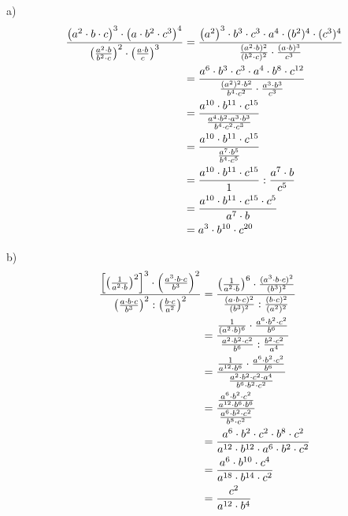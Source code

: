 \begin{solucio}
a)%
\begin{align*}
\frac{\left( a^{2}\cdot b\cdot c\right) ^{3}\cdot \left( a\cdot b^{2}\cdot
c^{3}\right) ^{4}}{\left( \frac{a^{2}\cdot b}{b^{2}\cdot c}\right) ^{2}\cdot
\left( \frac{a\cdot b}{c}\right) ^{3}} &=\frac{\left( a^{2}\right)
^{3}\cdot b^{3}\cdot c^{3}\cdot a^{4}\cdot (b^{2})^{4}\cdot (c^{3})^{4}}{%
\frac{(a^{2}\cdot b)^{2}}{(b^{2}\cdot c)^{2}}\cdot \frac{(a\cdot b)^{3}}{%
c^{3}}} \\
&=\frac{a^{6}\cdot b^{3}\cdot c^{3}\cdot a^{4}\cdot b^{8}\cdot c^{12}}{%
\frac{(a^{2})^{2}\cdot b^{2}}{b^{4}\cdot c^{2}}\cdot \frac{a^{3}\cdot b^{3}}{%
c^{3}}} \\
&=\frac{a^{10}\cdot b^{11}\cdot c^{15}}{\frac{a^{4}\cdot b^{2}\cdot
a^{3}\cdot b^{3}}{b^{4}\cdot c^{2}\cdot c^{3}}} \\
&=\frac{a^{10}\cdot b^{11}\cdot c^{15}}{\frac{a^{7}\cdot b^{5}}{b^{4}\cdot
c^{5}}} \\
&=\frac{a^{10}\cdot b^{11}\cdot c^{15}}{1}:\frac{a^{7}\cdot b}{c^{5}} \\
&=\frac{a^{10}\cdot b^{11}\cdot c^{15}\cdot c^{5}}{a^{7}\cdot b} \\
&=a^{3}\cdot b^{10}\cdot c^{20}
\end{align*}

b)%
\begin{align*}
\frac{\left[ \left( \frac{1}{a^{2}\cdot b}\right) ^{2}\right] ^{3}\cdot
\left( \frac{a^{3}\cdot b\cdot c}{b^{3}}\right) ^{2}}{\left( \frac{a\cdot
b\cdot c}{b^{3}}\right) ^{2}:\left( \frac{b\cdot c}{a^{2}}\right) ^{2}} &=%
\frac{\left( \frac{1}{a^{2}\cdot b}\right) ^{6}\cdot \frac{(a^{3}\cdot
b\cdot c)^{2}}{(b^{3})^{2}}}{\frac{(a\cdot b\cdot c)^{2}}{(b^{3})^{2}}:\frac{%
(b\cdot c)^{2}}{(a^{2})^{2}}} \\
&=\frac{\frac{1}{(a^{2}\cdot b)^{6}}\cdot \frac{a^{6}\cdot b^{2}\cdot c^{2}%
}{b^{6}}}{\frac{a^{2}\cdot b^{2}\cdot c^{2}}{b^{6}}:\frac{b^{2}\cdot c^{2}}{%
a^{4}}} \\
&=\frac{\frac{1}{a^{12}\cdot b^{6}}\cdot \frac{a^{6}\cdot b^{2}\cdot c^{2}}{%
b^{6}}}{\frac{a^{2}\cdot b^{2}\cdot c^{2}\cdot a^{4}}{b^{6}\cdot b^{2}\cdot
c^{2}}} \\
&=\frac{\frac{a^{6}\cdot b^{2}\cdot c^{2}}{a^{12}\cdot b^{6}\cdot b^{6}}}{%
\frac{a^{6}\cdot b^{2}\cdot c^{2}}{b^{8}\cdot c^{2}}} \\
&=\frac{a^{6}\cdot b^{2}\cdot c^{2}\cdot b^{8}\cdot c^{2}}{a^{12}\cdot
b^{12}\cdot a^{6}\cdot b^{2}\cdot c^{2}} \\
&=\frac{a^{6}\cdot b^{10}\cdot c^{4}}{a^{18}\cdot b^{14}\cdot c^{2}} \\
&=\frac{c^{2}}{a^{12}\cdot b^{4}}
\end{align*}
\end{solucio}

